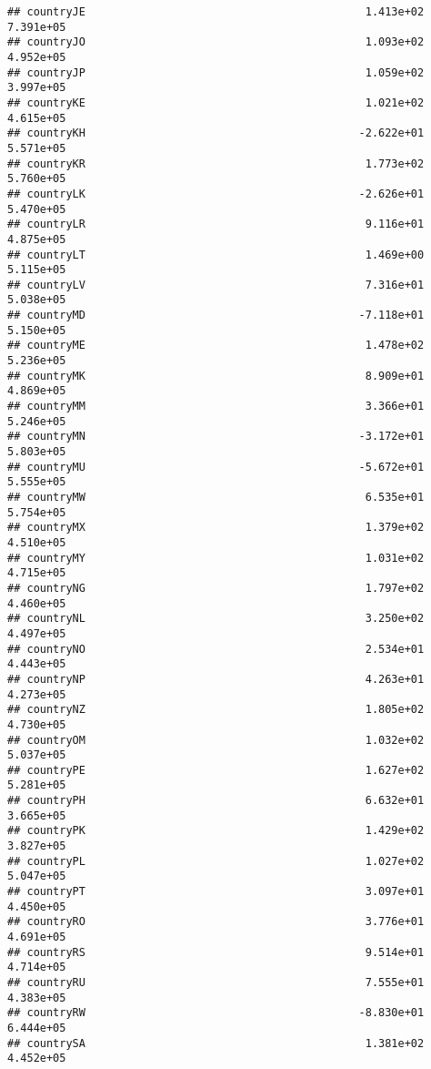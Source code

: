 \documentclass[
]{article}
\begin{document}
\begin{verbatim}
## countryJE                                           1.413e+02  7.391e+05
## countryJO                                           1.093e+02  4.952e+05
## countryJP                                           1.059e+02  3.997e+05
## countryKE                                           1.021e+02  4.615e+05
## countryKH                                          -2.622e+01  5.571e+05
## countryKR                                           1.773e+02  5.760e+05
## countryLK                                          -2.626e+01  5.470e+05
## countryLR                                           9.116e+01  4.875e+05
## countryLT                                           1.469e+00  5.115e+05
## countryLV                                           7.316e+01  5.038e+05
## countryMD                                          -7.118e+01  5.150e+05
## countryME                                           1.478e+02  5.236e+05
## countryMK                                           8.909e+01  4.869e+05
## countryMM                                           3.366e+01  5.246e+05
## countryMN                                          -3.172e+01  5.803e+05
## countryMU                                          -5.672e+01  5.555e+05
## countryMW                                           6.535e+01  5.754e+05
## countryMX                                           1.379e+02  4.510e+05
## countryMY                                           1.031e+02  4.715e+05
## countryNG                                           1.797e+02  4.460e+05
## countryNL                                           3.250e+02  4.497e+05
## countryNO                                           2.534e+01  4.443e+05
## countryNP                                           4.263e+01  4.273e+05
## countryNZ                                           1.805e+02  4.730e+05
## countryOM                                           1.032e+02  5.037e+05
## countryPE                                           1.627e+02  5.281e+05
## countryPH                                           6.632e+01  3.665e+05
## countryPK                                           1.429e+02  3.827e+05
## countryPL                                           1.027e+02  5.047e+05
## countryPT                                           3.097e+01  4.450e+05
## countryRO                                           3.776e+01  4.691e+05
## countryRS                                           9.514e+01  4.714e+05
## countryRU                                           7.555e+01  4.383e+05
## countryRW                                          -8.830e+01  6.444e+05
## countrySA                                           1.381e+02  4.452e+05

\end{verbatim}
\end{document}

